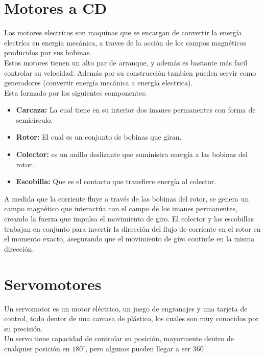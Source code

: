 \documentclass[11pt]{scrartcl}
\begin{document}
\section{Motores a CD}

Los motores electricos son maquinas que se encargan de convertir la energía electríca en energía mecánica, a traves de la acción de los campos magnéticos producidos por sus bobinas. \\

Estos motores tienen un alto par de arranque, y además es bastante más facil controlar su velocidad. Además por su construcción tambien pueden servir como generadores (convertir energía mecánica a energía electrica). \\

Esta formado por los siguientes componentes:

\begin{itemize}
    \item \textbf{Carcaza: } La cual tiene en su interior dos imanes permanentes con forma de semicirculo. 
    \item \textbf{Rotor: } El cual es un conjunto de bobinas que giran.
    \item \textbf{Colector: } es un anillo deslizante que suministra energía a las bobinas del rotor.
    \item \textbf{Escobilla: } Que es el contacto que transfiere energía al colector. 
\end{itemize}

A medida que la corriente fluye a través de las bobinas del rotor, se genera un campo magnético que interactúa con el campo de los imanes permanentes, creando la fuerza que impulsa el movimiento de giro. El colector y las escobillas trabajan en conjunto para invertir la dirección del flujo de corriente en el rotor en el momento exacto, asegurando que el movimiento de giro continúe en la misma dirección.


\section{Servomotores}


Un servomotor es un motor eléctrico, un juego de engranajes y una tarjeta de control, todo dentor de una carcasa de plástico, los cuales son muy conocidos por su precisión.  \\

Un servo tiene capacidad de controlar su posición, mayormente dentro de cualquier posición en $180^{\circ}$, pero algunos pueden llegar a ser $360^{\circ}$. \\
\end{document}

